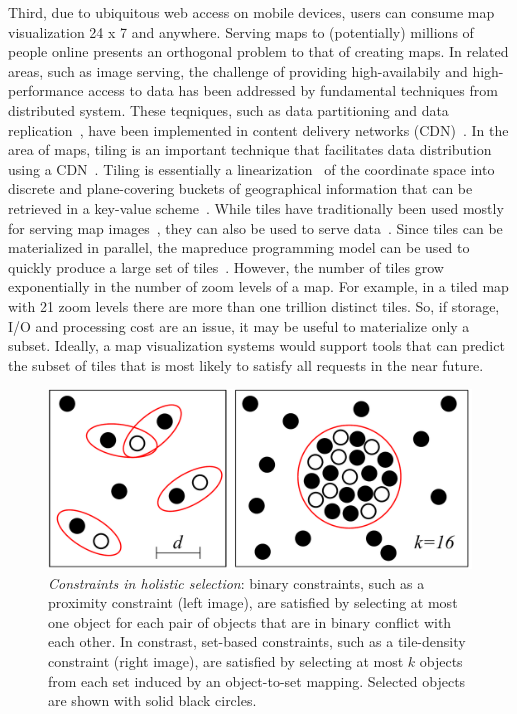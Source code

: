 \documentclass[11pt, oneside]{report}
\begin{document}
{%
Third, due to ubiquitous web access on mobile devices, users can consume map visualization 24 x 7 and anywhere. Serving maps to (potentially) millions of people online presents an orthogonal problem to that of creating maps. In related areas, such as image serving, the challenge of providing high-availabily and high-performance access to data has been addressed by fundamental techniques from distributed system. These teqniques, such as data partitioning and data replication~\cite{barroso2009datacenter}, have been implemented in content delivery networks (CDN)~\cite{beaver2010haystack}. In the area of maps, tiling is an important technique that facilitates data distribution using a CDN~\cite{decola93,mbtile12}. Tiling is essentially a linearization~\cite{zcurve, hilbertcurve} of the coordinate space into discrete and plane-covering buckets of geographical information that can be retrieved in a key-value scheme~\cite{osm2014xyz}. While tiles have traditionally been used mostly for serving map images~\cite{}, they can also be used to serve data~\cite{gaffuri12vectortiles}. Since tiles can be materialized in parallel, the mapreduce programming model can be used to quickly produce a large set of tiles~\cite{dean04,dean2009designs}. However, the number of tiles grow exponentially in the number of zoom levels of a map. For example, in a tiled map with 21 zoom levels there are more than one trillion distinct tiles. So, if storage, I/O and processing cost are an issue, it may be useful to materialize only a subset. Ideally, a map visualization systems would support tools that can predict the subset of tiles that is most likely to satisfy all requests in the near future.





\begin{figure}[htbp]
\begin{center}
\includegraphics[scale=.45]{figs-thesis/holistic-selection.pdf}
\caption{\emph{Constraints in holistic selection}: binary constraints, such as a proximity constraint (left image), are satisfied by selecting at most one object for each pair of objects that are in binary conflict with each other. In constrast, set-based constraints, such as a tile-density constraint (right image), are satisfied by selecting at most $k$ objects from each set induced by an object-to-set mapping. Selected objects are shown with solid black circles.}
\label{fig:introduction:holistic:selection}
\end{center}
\vspace*{-4ex}
\end{figure}

}
\end{document}
